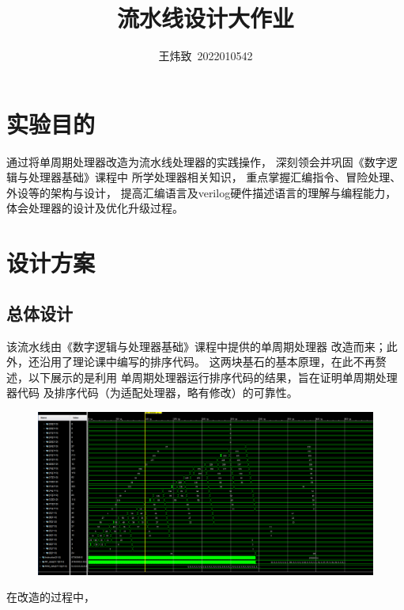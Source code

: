 \documentclass[10pt]{article}
\title{流水线设计大作业}
\author{王炜致\ 2022010542}
\date{}
\begin{document}
\maketitle 
\section{实验目的}
通过将单周期处理器改造为流水线处理器的实践操作，
深刻领会并巩固《数字逻辑与处理器基础》课程中
所学处理器相关知识，
重点掌握汇编指令、冒险处理、外设等的架构与设计，
提高汇编语言及verilog硬件描述语言的理解与编程能力，
体会处理器的设计及优化升级过程。
\section{设计方案}
\subsection{总体设计}
该流水线由《数字逻辑与处理器基础》课程中提供的单周期处理器
改造而来；此外，还沿用了理论课中编写的排序代码。
这两块基石的基本原理，在此不再赘述，以下展示的是利用
单周期处理器运行排序代码的结果，旨在证明单周期处理器代码
及排序代码（为适配处理器，略有修改）的可靠性。
\begin{figure}[H]
    \centering
    \includegraphics[scale=0.38]{MUCHOGUSTO.png}
    \end{figure}

在改造的过程中，
\end{document}
